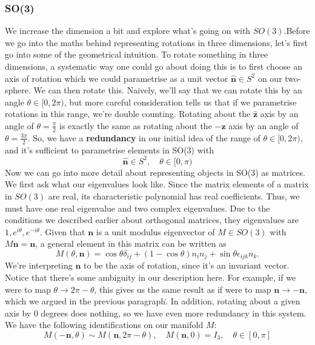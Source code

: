 \subsubsection{SO(3)}
We increase the dimension a bit and explore what's going on with $SO(3)$.Before we go into the maths behind representing rotations in three dimensions, let's first go into some of the geometrical intuition. To rotate something in three dimensions, a systematic way one could go about doing this is to first choose an axis of rotation which we could parametrise as a unit vector $\hat{\mathbf{n}} \in S^2 $ on our two-sphere. We can then rotate this. Naively, we'll say that we can rotate this by an angle $\theta \in [0, 2\pi)$, but more careful consideration tells us that if we parametrise rotations in this range, we're double counting. Rotating about the $\hat{ \mathbf{z} } $ axis by an angle of $ \theta  = \frac{ \pi }{ 2 } $ is exactly the same as rotating about the $ - \hat{ \mathbf { z} } $ axis by an angle of $ \theta  = \frac{ 3 \pi}{ 2} $. So, we have a \textbf{redundancy} in our initial idea of the range of $\theta \in [0, 2 \pi)$, and it's sufficient to parametrise elements in SO(3) with 
\[ 
	\hat{ \mathbf{ n } } \in S^2, \quad \theta \in [0 , \pi ) 
\] Now we can go into more detail about representing objects in SO(3) as matrices.  We first ask what our eigenvalues look like. Since the matrix elements of a matrix in $SO(3)$ are real, its characteristic polynomial has real coefficients. Thus, we must have one real eigenvalue and two complex eigenvalues. Due to the conditions we described earlier about orthogonal matrices, they eigenvalues are $1, e^{i \theta}, e^{ - i \theta}$. 
Given that $\mathbf{n}$ is a unit modulus eigenvector of $M \in SO(3)$ with $M \mathbf{n} = \mathbf{n}$, a general element in this matrix can be written as 
\[
	M(\theta, \mathbf{n}) = \cos \theta \delta_{ij} + (1 - \cos \theta) n_i n _j  + \sin \theta \epsilon_{ijk} n_k. 
\]
We're interpreting $\mathbf{n}$ to be the axis of rotation, since it's an invariant vector. Notice that there's some ambiguity in our description here. For example, if we were to map $\theta \rightarrow 2 \pi - \theta$, this gives us the same result as if were to map $\mathbf{n} \rightarrow - \mathbf{n}$, which we argued in the previous paragraph\. . In addition, rotating about a given axis by 0 degrees does nothing, so we have even more redundancy in this system. We have the following identifications on our manifold $M$: 
\[ 
	M( - \mathbf{n}, \theta ) \sim M ( \mathbf{n}, 2\pi - \theta), \quad M(\mathbf{n}, 0 )  = I_3, \quad \theta \in [ 0, \pi] 
\] 
